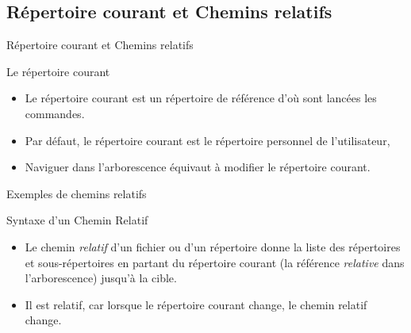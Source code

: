 \subsection{Répertoire courant et Chemins relatifs}
\begin{frame}{Répertoire courant et Chemins relatifs}
  \begin{block}{Le répertoire courant}
    \begin{itemize}
    \item Le répertoire courant est un répertoire de référence d'où sont lancées les commandes.
    \item Par défaut, le répertoire courant est le répertoire personnel de l'utilisateur,
    \item Naviguer dans l'arborescence équivaut à modifier le répertoire courant.
    \end{itemize}
  \end{block}
  \begin{block}{Exemples de chemins relatifs}
  \end{block}
  \begin{alertblock}{Syntaxe d'un Chemin Relatif}
    \begin{itemize}
    \item Le chemin \textit{relatif} d'un fichier ou d'un répertoire donne la liste des répertoires et sous-répertoires en partant du répertoire courant (la référence \textit{relative} dans l'arborescence) jusqu'à la cible.
    \item Il est relatif, car lorsque le répertoire courant change, le chemin relatif change.
    \end{itemize}
  \end{alertblock}
\end{frame}

